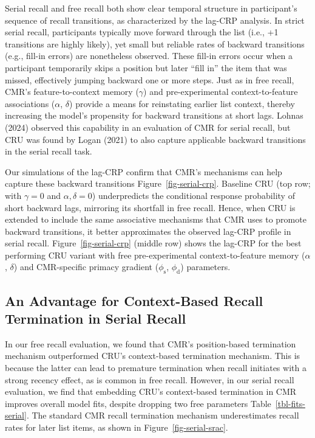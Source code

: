 \documentclass[
  letterpaper,
  DIV=11,
  numbers=noendperiod]{scrartcl}
\begin{document}
Serial recall and free recall both show clear temporal structure in
participant's sequence of recall transitions, as characterized by the
lag-CRP analysis. In strict serial recall, participants typically move
forward through the list (i.e., +1 transitions are highly likely), yet
small but reliable rates of backward transitions (e.g., fill-in errors)
are nonetheless observed. These fill-in errors occur when a participant
temporarily skips a position but later ``fill in'' the item that was
missed, effectively jumping backward one or more steps. Just as in free
recall, CMR's feature-to-context memory (\(\gamma\)) and
pre-experimental context-to-feature associations (\(\alpha\),
\(\delta\)) provide a means for reinstating earlier list context,
thereby increasing the model's propensity for backward transitions at
short lags. Lohnas (2024) observed this capability in an evaluation of
CMR for serial recall, but CRU was found by Logan (2021) to also capture
applicable backward transitions in the serial recall task.

Our simulations of the lag-CRP confirm that CMR's mechanisms can help
capture these backward transitions Figure~\ref{fig-serial-crp}. Baseline
CRU (top row; with \(\gamma=0\) and \(\alpha, \delta=0\)) underpredicts
the conditional response probability of short backward lags, mirroring
its shortfall in free recall. Hence, when CRU is extended to include the
same associative mechanisms that CMR uses to promote backward
transitions, it better approximates the observed lag-CRP profile in
serial recall. Figure~\ref{fig-serial-crp} (middle row) shows the
lag-CRP for the best performing CRU variant with free pre-experimental
context-to-feature memory (\(\alpha\), \(\delta\)) and CMR-specific
primacy gradient (\(\phi_\text{s}\), \(\phi_\text{d}\)) parameters.

\subsection{An Advantage for Context-Based Recall Termination in Serial
Recall}\label{an-advantage-for-context-based-recall-termination-in-serial-recall}

In our free recall evaluation, we found that CMR's position-based
termination mechanism outperformed CRU's context-based termination
mechanism. This is because the latter can lead to premature termination
when recall initiates with a strong recency effect, as is common in free
recall. However, in our serial recall evaluation, we find that embedding
CRU's context-based termination in CMR improves overall model fits,
despite dropping two free parameters Table~\ref{tbl-fits-serial}. The
standard CMR recall termination mechanism underestimates recall rates
for later list items, as shown in Figure~\ref{fig-serial-srac}.
\end{document}
